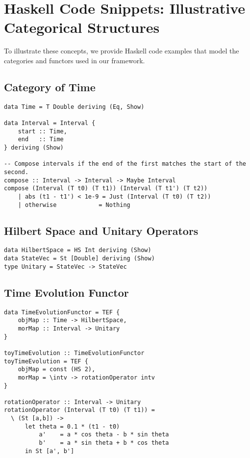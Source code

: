 \documentclass[12pt]{article}
\begin{document}
\section{Haskell Code Snippets: Illustrative Categorical Structures}
\label{sec:Haskell}
To illustrate these concepts, we provide Haskell code examples that model the categories and functors used in our framework.

\subsection{Category of Time}
\begin{lstlisting}[caption={Category of Time in Haskell (simplified)}]
data Time = T Double deriving (Eq, Show)

data Interval = Interval {
    start :: Time,
    end   :: Time
} deriving (Show)

-- Compose intervals if the end of the first matches the start of the second.
compose :: Interval -> Interval -> Maybe Interval
compose (Interval (T t0) (T t1)) (Interval (T t1') (T t2))
    | abs (t1 - t1') < 1e-9 = Just (Interval (T t0) (T t2))
    | otherwise            = Nothing
\end{lstlisting}

\subsection{Hilbert Space and Unitary Operators}
\begin{lstlisting}[caption={Hilbert space abstraction and state representation}]
data HilbertSpace = HS Int deriving (Show)
data StateVec = St [Double] deriving (Show)
type Unitary = StateVec -> StateVec
\end{lstlisting}

\subsection{Time Evolution Functor}
\begin{lstlisting}[caption={Defining a functor for time evolution}]
data TimeEvolutionFunctor = TEF {
    objMap :: Time -> HilbertSpace,
    morMap :: Interval -> Unitary
}

toyTimeEvolution :: TimeEvolutionFunctor
toyTimeEvolution = TEF {
    objMap = const (HS 2),
    morMap = \intv -> rotationOperator intv
}

rotationOperator :: Interval -> Unitary
rotationOperator (Interval (T t0) (T t1)) =
  \ (St [a,b]) ->
      let theta = 0.1 * (t1 - t0)
          a'    = a * cos theta - b * sin theta
          b'    = a * sin theta + b * cos theta
      in St [a', b']
\end{lstlisting}
\end{document}
